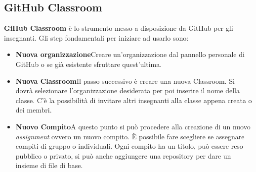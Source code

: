 		\subsection{GitHub Classroom}\label{def:Classroom}
				\begin{center}
			\end{center}
		
			\textbf{GiHub Classroom} è lo strumento messo a disposizione da GitHub per gli insegnanti. Gli step fondamentali per iniziare ad usarlo sono:
			\begin{itemize}
				\item\textbf{Nuova organizzazione}\quad Creare un'organizzazione dal pannello personale di GitHub o se già esistente sfruttare quest'ultima.
				\item\textbf{Nuova Classroom}\quad Il passo successivo è creare una nuova Classroom. Si dovrà selezionare l'organizzazione desiderata per poi inserire il nome della classe. C'è la possibilità di invitare altri insegnanti alla classe appena creata o dei membri.
				\item\textbf{Nuovo Compito}\quad A questo punto si può procedere alla creazione di un nuovo \textit{assignment} ovvero un nuovo compito.  \`E possibile fare scegliere se assegnare compiti di gruppo o individuali. Ogni compito ha un titolo, può essere reso pubblico o privato, si può anche aggiungere una repository per dare un insieme di file di base.  
			\end{itemize}
			
			
			
			